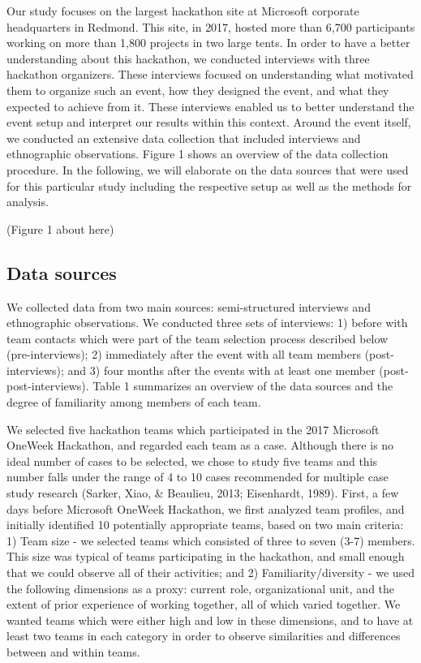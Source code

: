 \documentclass{hcij}
\begin{document}
Our study focuses on the largest hackathon site at Microsoft corporate headquarters in Redmond. This site, in 2017, hosted more than 6,700 participants working on more than 1,800 projects in two large tents. In order to have a better understanding about this hackathon, we conducted interviews with three hackathon organizers. These interviews focused on understanding what motivated them to organize such an event, how they designed the event, and what they expected to achieve from it. These interviews enabled us to better understand the event setup and interpret our results within this context. Around the event itself, we conducted an extensive data collection that included interviews and ethnographic observations. Figure 1 shows an overview of the data collection procedure. In the following, we will elaborate on the data sources that were used for this particular study including the respective setup as well as the methods for analysis.

(Figure 1 about here)

\subsection{Data sources}
We collected data from two main sources: semi-structured interviews and ethnographic observations. We conducted three sets of interviews: 1) before with team contacts which were part of the team selection process described below (pre-interviews); 2) immediately after the event with all team members (post-interviews); and 3) four months after the events with at least one member (post-post-interviews). Table 1 summarizes an overview of the data sources and the degree of familiarity among members of each team.

We selected five hackathon teams which participated in the 2017 Microsoft OneWeek Hackathon, and regarded each team as a case. Although there is no ideal number of cases to be selected, we chose to study five teams and this number falls under the range of 4 to 10 cases recommended for multiple case study research (Sarker, Xiao, & Beaulieu, 2013; Eisenhardt, 1989). First, a few days before Microsoft OneWeek Hackathon, we first analyzed team profiles, and initially identified 10 potentially appropriate teams, based on two main criteria: 1) Team size - we selected teams which consisted of three to seven (3-7) members. This size was typical of teams participating in the hackathon, and small enough that we could observe all of their activities; and 2) Familiarity/diversity - we used the following dimensions as a proxy: current role, organizational unit, and the extent of prior experience of working together, all of which varied together. We wanted teams which were either high and low in these dimensions, and to have at least two teams in each category in order to observe similarities and differences between and within teams.
\end{document}
